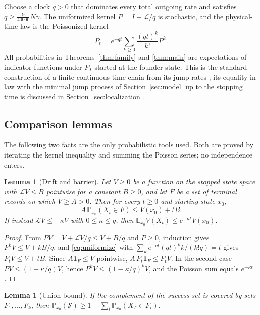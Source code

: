\documentclass[11pt,a4paper]{article}
\theoremstyle{plain}
\newtheorem{lemma}[theorem]{Lemma}
\theoremstyle{definition}
\theoremstyle{remark}
\newcommand{\E}{\mathbb E}
\newcommand{\Prb}{\mathbb P}
\newcommand{\cL}{\mathcal L}
\newcommand{\cS}{\mathcal S}
\newcommand{\ind}{\mathbf 1}
\begin{document}
Choose a clock $q>0$ that dominates every total outgoing rate and satisfies $q\geq\frac9{40000}N\gamma$. The uniformized kernel $P=I+\cL/q$ is stochastic, and the physical-time law is the Poissonized kernel
\begin{equation}\label{eq:uniformize}
P_t=e^{-qt}\sum_{k\geq0}\frac{(qt)^k}{k!}P^k .
\end{equation}
All probabilities in Theorems~\ref{thm:family} and \ref{thm:main} are expectations of indicator functions under $P_T$ started at the founder state. This is the standard construction of a finite continuous-time chain from its jump rates \citep{norris1997}; its equality in law with the minimal jump process of Section~\ref{sec:model} up to the stopping time is discussed in Section~\ref{sec:localization}.

\subsection{Comparison lemmas}
The following two facts are the only probabilistic tools used. Both are proved by iterating the kernel inequality and summing the Poisson series; no independence enters.

\begin{lemma}[Drift and barrier]\label{lem:barrier}
Let $V\geq0$ be a function on the stopped state space with $\cL V\leq B$ pointwise for a constant $B\geq0$, and let $F$ be a set of terminal records on which $V\geq A>0$. Then for every $t\geq0$ and starting state $x_0$,
\begin{equation}\label{eq:driftbound}
A\,\Prb_{x_0}(X_t\in F)\leq V(x_0)+tB.
\end{equation}
If instead $\cL V\leq-\kappa V$ with $0\leq\kappa\leq q$, then $\E_{x_0}V(X_t)\leq e^{-\kappa t}V(x_0)$.
\end{lemma}
\begin{proof}
From $PV=V+\cL V/q\leq V+B/q$ and $P\geq0$, induction gives $P^kV\leq V+kB/q$, and \eqref{eq:uniformize} with $\sum_ke^{-qt}(qt)^kk/(k!q)=t$ gives $P_tV\leq V+tB$. Since $A\ind_F\leq V$ pointwise, $A\,P_t\ind_F\leq P_tV$. In the second case $PV\leq(1-\kappa/q)V$, hence $P^kV\leq(1-\kappa/q)^kV$, and the Poisson sum equals $e^{-\kappa t}$.
\end{proof}

\begin{lemma}[Union bound]\label{lem:union}
If the complement of the success set is covered by sets $F_1,\dots,F_k$, then $\Prb_{x_0}(\cS)\geq1-\sum_i\Prb_{x_0}(X_T\in F_i)$.
\end{lemma}
\end{document}
